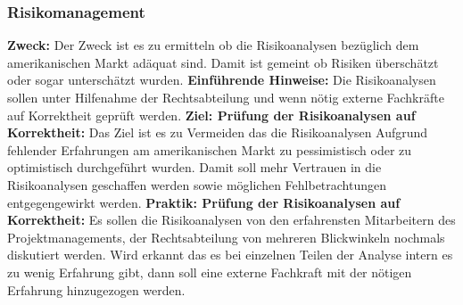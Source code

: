 \subsubsection{Risikomanagement}
\textbf{Zweck:}
\newline
Der Zweck ist es zu ermitteln ob die Risikoanalysen bezüglich dem amerikanischen Markt adäquat sind. Damit ist gemeint ob Risiken überschätzt oder sogar unterschätzt wurden.
\newline
\newline
\textbf{Einführende Hinweise:}
\newline
Die Risikoanalysen sollen unter Hilfenahme der Rechtsabteilung und wenn nötig externe Fachkräfte auf Korrektheit geprüft werden. 
\newline
\newline
\textbf{Ziel: Prüfung der Risikoanalysen auf Korrektheit:}
\newline
Das Ziel ist es zu Vermeiden das die Risikoanalysen Aufgrund fehlender Erfahrungen am amerikanischen Markt zu pessimistisch oder zu optimistisch durchgeführt wurden. Damit soll mehr Vertrauen in die Risikoanalysen geschaffen werden sowie möglichen Fehlbetrachtungen entgegengewirkt werden.
\newline
\newline
\textbf{Praktik: Prüfung der Risikoanalysen auf Korrektheit:}
\newline
Es sollen die Risikoanalysen von den erfahrensten Mitarbeitern des Projektmanagements, der Rechtsabteilung von mehreren Blickwinkeln nochmals diskutiert werden. Wird erkannt das es bei einzelnen Teilen der Analyse intern es zu wenig Erfahrung gibt, dann soll eine externe Fachkraft mit der nötigen Erfahrung hinzugezogen werden.
\newpage




 